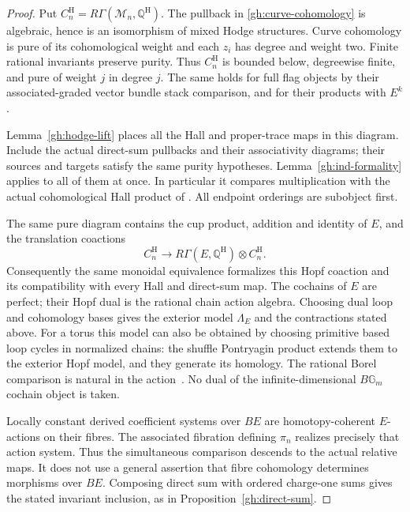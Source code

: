\begin{proof}
Put $C_n^{\mathrm H}=R\Gamma(\mathcal M_n,\mathbb Q^{\mathrm H})$.
The pullback in \eqref{gh:curve-cohomology} is algebraic, hence is an
isomorphism of mixed Hodge structures. Curve cohomology is pure of
its cohomological weight and each $z_i$ has degree and weight two.
Finite rational invariants preserve purity. Thus $C_n^{\mathrm H}$
is bounded below, degreewise finite, and pure of weight $j$ in degree
$j$. The same holds for full flag objects by their associated-graded
vector bundle stack comparison, and for their products with $E^k$.

Lemma~\ref{gh:hodge-lift} places all the Hall and proper-trace maps
in this diagram. Include the actual direct-sum pullbacks and their
associativity diagrams; their sources and targets satisfy the same
purity hypotheses. Lemma~\ref{gh:ind-formality} applies to all of
them at once. In particular it compares multiplication with the
actual cohomological Hall product of
\cite[\S3.3]{JindalLim2026}. All endpoint orderings are subobject
first.

The same pure diagram contains the cup product, addition and identity
of $E$, and the translation coactions
\[
 C_n^{\mathrm H}\longrightarrow
 R\Gamma(E,\mathbb Q^{\mathrm H})\otimes C_n^{\mathrm H}.
\]
Consequently the same monoidal equivalence formalizes this Hopf
coaction and its compatibility with every Hall and direct-sum map.
The cochains of $E$ are perfect; their Hopf dual is the rational
chain action algebra. Choosing dual loop and cohomology bases gives
the exterior model $\Lambda_E$ and the contractions stated above.
For a torus this model can also be obtained by choosing primitive
based loop cycles in normalized chains: the shuffle Pontryagin
product extends them to the exterior Hopf model, and they generate
its homology. The rational Borel comparison is natural in the
action~\cite{Franz2003}. No dual of the
infinite-dimensional $B\mathbb G_m$ cochain object is taken.

Locally constant derived coefficient systems over $BE$ are
homotopy-coherent $E$-actions on their fibres. The associated
fibration defining $\pi_n$ realizes precisely that action system.
Thus the simultaneous comparison descends to the actual relative
maps. It does not use a general assertion that fibre cohomology
determines morphisms over $BE$. Composing direct sum with ordered
charge-one sums gives the stated invariant inclusion, as in
Proposition~\ref{gh:direct-sum}.
\end{proof}


